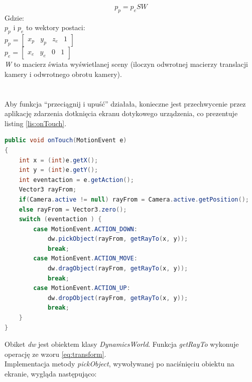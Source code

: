 \begin{equation}
p_{p} = p_{e} S W
\label{eq:transform}
\end{equation}
Gdzie:\\
$ p_{p} $ i $ p_{e} $ to wektory postaci:\\
$ p_{p} = \begin{bmatrix}x_{p}&y_{p}&z_{e}&1\end{bmatrix} $ \\
$ p_{e} = \begin{bmatrix}x_{e}&y_{e}&0&1\end{bmatrix} $ \\
\emph{W} to macierz świata wyświetlanej sceny (iloczyn odwrotnej macierzy
translacji kamery i odwrotnego obrotu kamery).\\
\\ \\
Aby funkcja ``przeciągnij i upuść'' działała, konieczne jest przechwycenie przez
aplikację zdarzenia dotknięcia ekranu dotykowego urządzenia, co prezentuje
listing \ref{lis:onTouch}.

\begin{lstlisting}[language=java, caption=Przechwycenie zdarzenia
dotknięcia ekranu.,label=lis:onTouch]public void onTouch(MotionEvent e)
{
	int x = (int)e.getX();
	int y = (int)e.getY();
	int eventaction = e.getAction();
	Vector3 rayFrom;
	if(Camera.active != null) rayFrom = Camera.active.getPosition();
	else rayFrom = Vector3.zero();
    switch (eventaction ) { 
    	case MotionEvent.ACTION_DOWN:
    		dw.pickObject(rayFrom, getRayTo(x, y));
    		break;
    	case MotionEvent.ACTION_MOVE:
    		dw.dragObject(rayFrom, getRayTo(x, y));
    		break;
    	case MotionEvent.ACTION_UP:
    		dw.dropObject(rayFrom, getRayTo(x, y));
    		break;
    }
}
\end{lstlisting}

Obiket \emph{dw} jest obiektem klasy \emph{DynamicsWorld}. Funkcja
\emph{getRayTo} wykonuje operację ze wzoru \ref{eq:transform}.\\

Implementacja metody \emph{pickObject}, wywoływanej po naciśnięciu obiektu na
ekranie, wygląda następująco:

